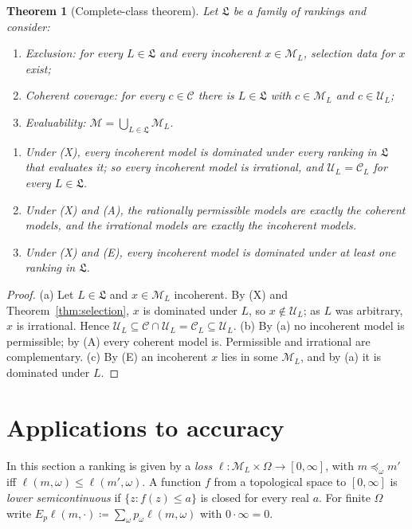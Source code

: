 \documentclass[11pt]{article}
\newtheorem{theorem}{Theorem}[section]
\theoremstyle{definition}
\theoremstyle{remark}
\newcommand{\M}{\mathcal M}
\newcommand{\C}{\mathcal C}
\newcommand{\U}{\mathcal U}
\newcommand{\Lf}{\mathfrak L}
\begin{document}
\begin{theorem}[Complete-class theorem]\label{thm:complete-class}
Let $\Lf$ be a family of rankings and consider:
\begin{enumerate}
\item[(X)] \emph{Exclusion}: for every $L\in\Lf$ and every incoherent $x\in\M_L$, selection data for $x$ exist;
\item[(A)] \emph{Coherent coverage}: for every $c\in\C$ there is $L\in\Lf$ with $c\in\M_L$ and $c\in\U_L$;
\item[(E)] \emph{Evaluability}: $\M=\bigcup_{L\in\Lf}\M_L$.
\end{enumerate}
\begin{enumerate}[label=(\alph*)]
\item Under (X), every incoherent model is dominated under every ranking in $\Lf$ that evaluates it; so every incoherent model is irrational, and $\U_L=\C_L$ for every $L\in\Lf$.
\item Under (X) and (A), the rationally permissible models are exactly the coherent models, and the irrational models are exactly the incoherent models.
\item Under (X) and (E), every incoherent model is dominated under at least one ranking in $\Lf$.
\end{enumerate}
\end{theorem}
\begin{proof}
(a) Let $L\in\Lf$ and $x\in\M_L$ incoherent. By (X) and Theorem~\ref{thm:selection}, $x$ is dominated under $L$, so $x\notin\U_L$; as $L$ was arbitrary, $x$ is irrational. Hence $\U_L\subseteq\C\cap\U_L=\C_L\subseteq\U_L$.
(b) By (a) no incoherent model is permissible; by (A) every coherent model is. Permissible and irrational are complementary.
(c) By (E) an incoherent $x$ lies in some $\M_L$, and by (a) it is dominated under $L$.
\end{proof}

\section{Applications to accuracy}\label{sec:applications}

In this section a ranking is given by a \emph{loss} $\ell:\M_L\times\Omega\to[0,\infty]$, with $m\preceq_\omega m'$ iff $\ell(m,\omega)\le\ell(m',\omega)$. A function $f$ from a topological space to $[0,\infty]$ is \emph{lower semicontinuous} if $\{z:f(z)\le a\}$ is closed for every real $a$. For finite $\Omega$ write $E_p\ell(m,\cdot)\coloneqq\sum_\omega p_\omega\ell(m,\omega)$ with $0\cdot\infty=0$.
\end{document}
